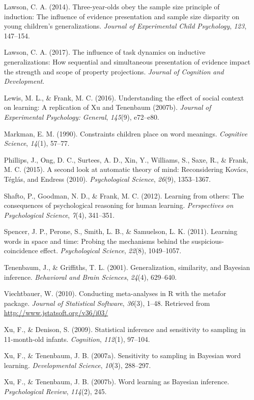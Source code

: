 \documentclass[english,floatsintext,man]{apa6}
\theoremstyle{definition}
\theoremstyle{definition}
\theoremstyle{definition}
\theoremstyle{remark}
\begin{document}
\hypertarget{ref-lawson2014three}{}
Lawson, C. A. (2014). Three-year-olds obey the sample size principle of
induction: The influence of evidence presentation and sample size
disparity on young children's generalizations. \emph{Journal of
Experimental Child Psychology}, \emph{123}, 147--154.

\hypertarget{ref-lawson2017influence}{}
Lawson, C. A. (2017). The influence of task dynamics on inductive
generalizations: How sequential and simultaneous presentation of
evidence impact the strength and scope of property projections.
\emph{Journal of Cognition and Development}.

\hypertarget{ref-lewis2016understanding}{}
Lewis, M. L., \& Frank, M. C. (2016). Understanding the effect of social
context on learning: A replication of Xu and Tenenbaum (2007b).
\emph{Journal of Experimental Psychology: General}, \emph{145}(9),
e72--e80.

\hypertarget{ref-markman1990constraints}{}
Markman, E. M. (1990). Constraints children place on word meanings.
\emph{Cognitive Science}, \emph{14}(1), 57--77.

\hypertarget{ref-phillips2015second}{}
Phillips, J., Ong, D. C., Surtees, A. D., Xin, Y., Williams, S., Saxe,
R., \& Frank, M. C. (2015). A second look at automatic theory of mind:
Reconsidering Kovács, Téglás, and Endress (2010). \emph{Psychological
Science}, \emph{26}(9), 1353--1367.

\hypertarget{ref-shafto2012}{}
Shafto, P., Goodman, N. D., \& Frank, M. C. (2012). Learning from
others: The consequences of psychological reasoning for human learning.
\emph{Perspectives on Psychological Science}, \emph{7}(4), 341--351.

\hypertarget{ref-spencer2011learning}{}
Spencer, J. P., Perone, S., Smith, L. B., \& Samuelson, L. K. (2011).
Learning words in space and time: Probing the mechanisms behind the
suspicious-coincidence effect. \emph{Psychological Science},
\emph{22}(8), 1049--1057.

\hypertarget{ref-tenenbaum2001}{}
Tenenbaum, J., \& Griffiths, T. L. (2001). Generalization, similarity,
and Bayesian inference. \emph{Behavioral and Brain Sciences},
\emph{24}(4), 629--640.

\hypertarget{ref-R-metafor}{}
Viechtbauer, W. (2010). Conducting meta-analyses in R with the metafor
package. \emph{Journal of Statistical Software}, \emph{36}(3), 1--48.
Retrieved from \url{http://www.jstatsoft.org/v36/i03/}

\hypertarget{ref-xu2009}{}
Xu, F., \& Denison, S. (2009). Statistical inference and sensitivity to
sampling in 11-month-old infants. \emph{Cognition}, \emph{112}(1),
97--104.

\hypertarget{ref-xu2007b}{}
Xu, F., \& Tenenbaum, J. B. (2007a). Sensitivity to sampling in Bayesian
word learning. \emph{Developmental Science}, \emph{10}(3), 288--297.

\hypertarget{ref-xu2007word}{}
Xu, F., \& Tenenbaum, J. B. (2007b). Word learning as Bayesian
inference. \emph{Psychological Review}, \emph{114}(2), 245.
\end{document}

